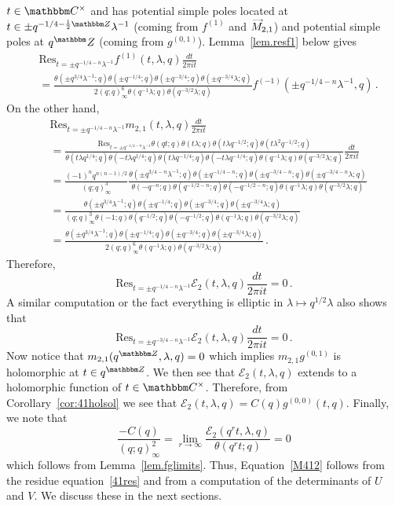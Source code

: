 \documentclass[12pt,reqno]{amsart}
\theoremstyle{definition}
\def\BZ{\mathbbm Z}
\def\BC{\mathbbm C}
\def\calE{\mathcal E}
\def\Res{\mathrm{Res}}
\def\be{\begin{equation}}
\def\ee{\end{equation}}
\def\vM{\accentset{\longrightarrow}{M}}
\begin{document}
$t \in \BC^{\times}$ and has potential simple poles located at
$t\in\pm q^{-1/4-\frac{1}{2}\BZ}\lambda^{-1}$ (coming from $f^{(1)}$ and $\vM_{2,1}$)
and potential simple poles at $q^\BZ$ (coming from $g^{(0,1)}$).
Lemma~\ref{lem.resf1} below gives
\be
\label{41res}
\begin{aligned}
&\Res_{t=\pm q^{-1/4-n}\lambda^{-1}}f^{(1)}(t,\lambda,q)\frac{dt}{2\pi it}\\
&=
\frac{\theta(\pm q^{3/4}\lambda^{-1};q)\theta(\pm q^{-1/4};q)
  \theta(\pm q^{-3/4};q)
  \theta(\pm q^{-3/4}\lambda;q)}{2(q;q)_{\infty}^{6}
  \theta(q^{-1}\lambda;q)\theta(q^{-3/2}\lambda;q)}
f^{(-1)}(\pm q^{-1/4-n} \lambda^{-1},q) \,.
\end{aligned}
\ee
On the other hand,
\be
\begin{aligned}
  &\Res_{t=\pm q^{-1/4-n}\lambda^{-1}}m_{2,1}(t,\lambda,q)
  \frac{dt}{2\pi it}\\
&=
\frac{\Res_{t=\pm q^{-1/4-n}\lambda^{-1}}\theta(qt;q)\theta(t\lambda;q)
  \theta(t\lambda q^{-1/2};q)
  \theta(t\lambda^{2}q^{-1/2};q)}{\theta(t\lambda q^{1/4};q)
  \theta(-t\lambda q^{1/4};q)\theta(t\lambda q^{-1/4};q)
  \theta(-t\lambda q^{-1/4};q)\theta(q^{-1}\lambda;q)\theta(q^{-3/2}
  \lambda;q)}\frac{dt}{2\pi it}\\
&=
\frac{(-1)^{n}q^{n(n-1)/2}}{(q;q)_{\infty}^{3}}\frac{\theta(\pm q^{3/4-n}
  \lambda^{-1};q)\theta(\pm q^{-1/4-n};q)\theta(\pm q^{-3/4-n};q)
  \theta(\pm q^{-3/4-n}\lambda;q)}{
  \theta(-q^{-n};q)\theta(q^{-1/2-n};q)
  \theta(-q^{-1/2-n};q)\theta(q^{-1}\lambda;q)\theta(q^{-3/2}\lambda;q)}\\
&=
\frac{\theta(\pm q^{3/4}\lambda^{-1};q)\theta(\pm q^{-1/4};q)
  \theta(\pm q^{-3/4};q)
  \theta(\pm q^{-3/4}\lambda;q)}{(q;q)_{\infty}^{3}
  \theta(-1;q)\theta(q^{-1/2};q)
  \theta(-q^{-1/2};q)\theta(q^{-1}\lambda;q)\theta(q^{-3/2}\lambda;q)}\\
&=
\frac{\theta(\pm q^{3/4}\lambda^{-1};q)\theta(\pm q^{-1/4};q)
  \theta(\pm q^{-3/4};q)
  \theta(\pm q^{-3/4}\lambda;q)}{2(q;q)_{\infty}^{6}
  \theta(q^{-1}\lambda;q)\theta(q^{-3/2}\lambda;q)} \,.
\end{aligned}
\ee
Therefore,
\be
\Res_{t=\pm q^{-1/4-n}\lambda^{-1}} \calE_2(t,\lambda,q) \frac{dt}{2\pi it}=0 \,.
\ee
A similar computation or the fact everything is elliptic in
$\lambda\mapsto q^{1/2}\lambda$ also shows that
\be
\Res_{t=\pm q^{-3/4-n}\lambda^{-1}} \calE_2(t,\lambda,q) \frac{dt}{2\pi it}=0 \,.
\ee
Now notice that $m_{2,1}(q^{\BZ},\lambda,q)=0$ which implies $m_{2,1}g^{(0,1)}$
is holomorphic at $t\in q^{\BZ}$. We then see that $\calE_2(t,\lambda,q)$ extends
to a holomorphic function of $t \in \BC^{\times}$. Therefore, from
Corollary~\ref{cor:41holsol} we see that $\calE_2(t,\lambda,q)=C(q)g^{(0,0)}(t,q)$.
Finally, we note that 
\be
\frac{-C(q)}{(q;q)_{\infty}^{2}}
=
\lim_{r\rightarrow\infty}\frac{\calE_{2}(q^{r}t,\lambda,q)}{\theta(q^{r}t;q)}
=
0
\ee
which follows from Lemma~\ref{lem.fglimits}.
Thus, Equation~\eqref{M412} follows from the residue equation~\eqref{41res}
and from a computation of the determinants of $U$ and $V$. We discuss these
in the next sections.
\end{document}
